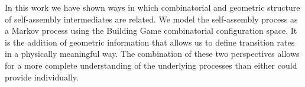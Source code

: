 













In this work we have shown ways in which combinatorial and geometric structure of self-assembly intermediates are related. We model the self-assembly process as a Markov process using the Building Game combinatorial configuration space. It is the addition of geometric information that allows us to define transition rates in a physically meaningful way. The combination of these two perspectives allows for a more complete understanding of the underlying processes than either could provide individually. 







